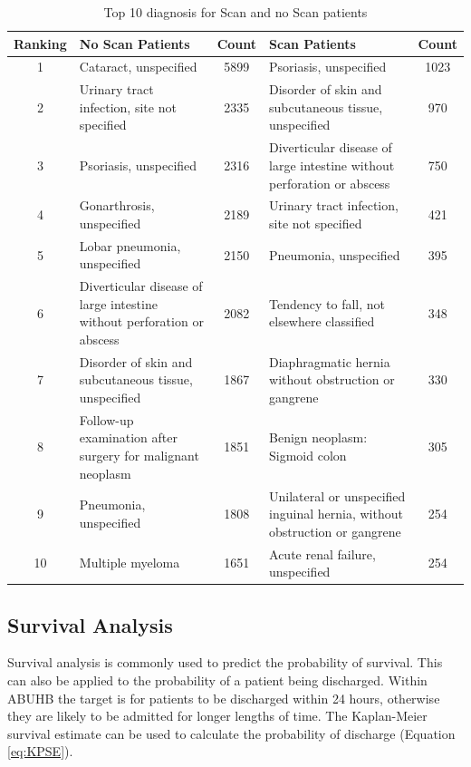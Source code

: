 \documentclass[../thesis.tex]{subfiles}
\begin{document}
\begin{table}[H]
    \centering
    \begin{tabular}{cp{5.5cm}cp{5.5cm}c}\toprule
    \textbf{Ranking}& \textbf{No Scan Patients} & \textbf{Count} & \textbf{Scan Patients} & \textbf{Count}   \\ \midrule
   1 & Cataract, unspecified  & 5899& Psoriasis, unspecified&	1023 \\
2&Urinary tract infection, site not specified   &  2335&Disorder of skin and subcutaneous tissue, unspecified	&970 \\
3&Psoriasis, unspecified& 2316 &Diverticular disease of large intestine without perforation or abscess	&750\\
4&Gonarthrosis, unspecified& 2189 &Urinary tract infection, site not specified&	421 \\
5&Lobar pneumonia, unspecified   & 2150& Pneumonia, unspecified&	395\\
6&Diverticular disease of large intestine without perforation or abscess&	2082&Tendency to fall, not elsewhere classified&	348\\
7&Disorder of skin and subcutaneous tissue, unspecified&	1867 &Diaphragmatic hernia without obstruction or gangrene	&330\\
8&Follow-up examination after surgery for malignant neoplasm&1851&Benign neoplasm: Sigmoid colon	&305\\
9&Pneumonia, unspecified&	1808 &Unilateral or unspecified inguinal hernia, without obstruction or gangrene&	254\\
10&Multiple myeloma&	1651 &Acute renal failure, unspecified&	254 \\
 \bottomrule
    \end{tabular}
    \caption{Top 10 diagnosis for Scan and no Scan patients}
    \label{Tab:Scancomp2}
\end{table}


\subsection{Survival Analysis}
Survival analysis is commonly used to predict the probability of survival. This can also be applied to the probability of a patient being discharged. Within ABUHB the target is for patients to be discharged within 24 hours, otherwise they are likely to be admitted for longer lengths of time. The Kaplan-Meier survival estimate can be used to calculate the probability of discharge (Equation \ref{eq:KPSE}).
\end{document}
